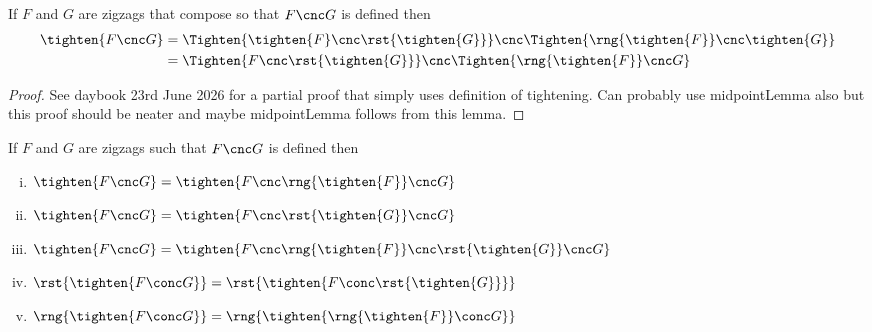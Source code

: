 \begin{lemma}
If $F$ and $G$ are zigzags that compose so that
$F \cnc G$ is defined then
\begin{align*}
\tighten{F \cnc G} 
    &= 
    \Tighten{ \tighten{F} \cnc \rst{\tighten{G}}}
     \cnc
    \Tighten{ \rng{\tighten{F}} \cnc \tighten{G}} \\
    &= 
    \Tighten{ F \cnc \rst{\tighten{G}}}
     \cnc
    \Tighten{ \rng{\tighten{F}} \cnc G} \\
\end{align*}
\end{lemma}
\begin{proof}
See daybook 23rd June 2026 for a partial proof that simply uses definition of tightening. Can probably use midpointLemma also but this proof should be neater and maybe midpointLemma follows from this lemma.
\end{proof}
\newcommand{\abrst}[1]{\rst{\tighten{#1}}}
\newcommand{\abrng}[1]{\rng{\tighten{#1}}}

\begin{lemma}
If $F$ and $G$ are zigzags such that $F \cnc G$ is defined then
\begin{enumerate}[(i)]
\item {} 
$\tighten{F \cnc G} = \tighten{F \cnc \abrng{F} \cnc G}$
\item {}
$\tighten{F \cnc G} = \tighten{F \cnc \abrst{G} \cnc G}$
\item {}
$\tighten{F \cnc G} = \tighten{F \cnc \abrng{F} \cnc \abrst{G} \cnc G}$
\item {}
$\abrst{F \conc G} = \abrst{F \conc \abrst{G}}$
\item {}
$\abrng{F \conc G} = \abrng{\abrng{F} \conc G}$
\end{enumerate}
\end{lemma}

